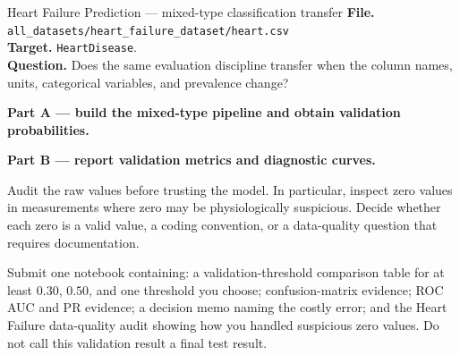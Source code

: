 \begin{kaggleproject}{Heart Failure Prediction --- mixed-type classification transfer}
\textbf{File.} \texttt{all\_datasets/heart\_failure\_dataset/heart.csv}\\
\textbf{Target.} \texttt{HeartDisease}.\\
\textbf{Question.} Does the same evaluation discipline transfer when the column names, units, categorical variables, and prevalence change?

\textbf{Part A --- build the mixed-type pipeline and obtain validation probabilities.}



\textbf{Part B --- report validation metrics and diagnostic curves.}



\begin{tryit}
Audit the raw values before trusting the model. In particular, inspect zero values in measurements where zero may be physiologically suspicious. Decide whether each zero is a valid value, a coding convention, or a data-quality question that requires documentation.
\end{tryit}
\end{kaggleproject}

\begin{labdeliverable}
Submit one notebook containing: a validation-threshold comparison table for at least $0.30$, $0.50$, and one threshold you choose; confusion-matrix evidence; ROC AUC and PR evidence; a decision memo naming the costly error; and the Heart Failure data-quality audit showing how you handled suspicious zero values. Do not call this validation result a final test result.
\end{labdeliverable}
